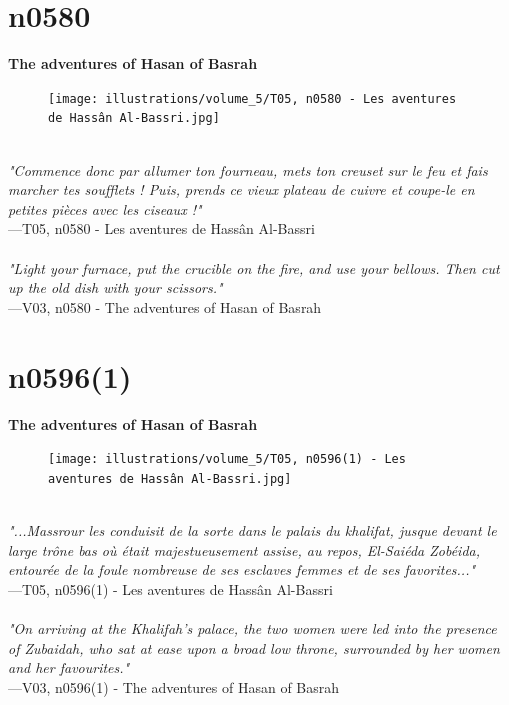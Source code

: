 \documentclass[../Carre_nights.tex]{subfiles}
\begin{document}
\newpage

\section{n0580}
\textbf{\Large{The adventures of Hasan of Basrah}} \\

\begin{figure}[ht]
\centering
\texttt{[image: illustrations/volume\_5/T05, n0580 - Les aventures de Hassân Al-Bassri.jpg]}
\end{figure}

\textit{\\
"Commence donc par allumer ton fourneau, mets ton creuset sur le feu et fais marcher tes soufflets ! Puis, prends ce vieux plateau de cuivre et coupe-le en petites pièces avec les ciseaux !"} \\
—T05, n0580 - Les aventures de Hassân Al-Bassri \\~\\
\textit{"Light your furnace, put the crucible on the fire, and use your bellows. Then cut up the old dish with your scissors."} \\
—V03, n0580 - The adventures of Hasan of Basrah

\newpage

\section{n0596(1)}
\textbf{\Large{The adventures of Hasan of Basrah}} \\

\begin{figure}[ht]
\centering
\texttt{[image: illustrations/volume\_5/T05, n0596(1) - Les aventures de Hassân Al-Bassri.jpg]}
\end{figure}

\textit{\\
"...Massrour les conduisit de la sorte dans le palais du khalifat, jusque devant le large trône bas où était majestueusement assise, au repos, El-Saiéda Zobéida, entourée de la foule nombreuse de ses esclaves femmes et de ses favorites..."} \\
—T05, n0596(1) - Les aventures de Hassân Al-Bassri \\~\\
\textit{"On arriving at the Khalifah's palace, the two women were led into the presence of Zubaidah, who sat at ease upon a broad low throne, surrounded by her women and her favourites."} \\
—V03, n0596(1) - The adventures of Hasan of Basrah
\end{document}
